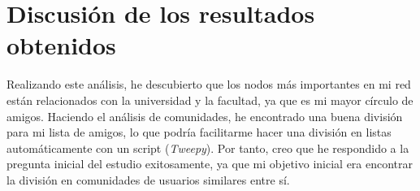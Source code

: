 \documentclass[10pt,a4paper,spanish]{article}
\numberwithin{equation}{section} %
\numberwithin{figure}{section} %
\numberwithin{table}{section} %
\begin{document}
\section{Discusión de los resultados obtenidos}

Realizando este análisis, he descubierto que los nodos más importantes en mi red están relacionados con la universidad y la facultad, ya que es mi mayor círculo de amigos. Haciendo el análisis de comunidades, he encontrado una buena división para mi lista de amigos, lo que podría facilitarme hacer una división en listas automáticamente con un script (\textit{Tweepy}). Por tanto, creo que he respondido a la pregunta inicial del estudio exitosamente, ya que mi objetivo inicial era encontrar la división en comunidades de usuarios similares entre sí. 

\end{document}
